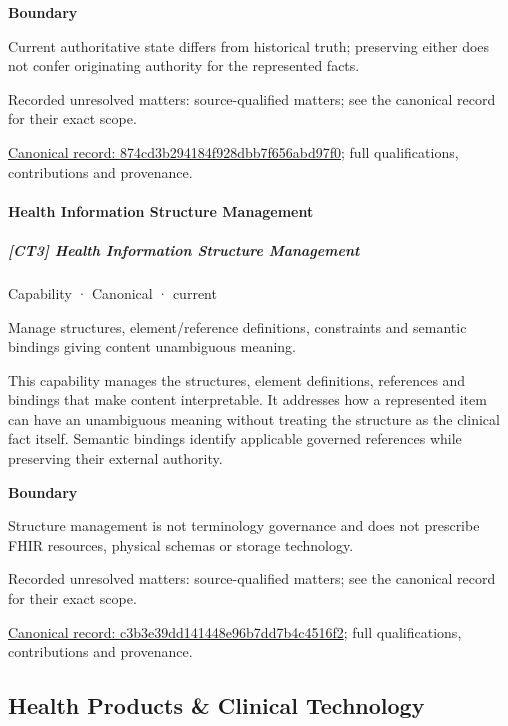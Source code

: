\textbf{Boundary}



Current authoritative state differs from historical truth; preserving either does not confer originating authority for the represented facts.


{\small Recorded unresolved matters: source-qualified matters; see the canonical record for their exact scope.}\par
{\footnotesize \href{../../../../continuum/strategy/capability/874cd3b294184f928dbb7f656abd97f0.md}{Canonical record: 874cd3b294184f928dbb7f656abd97f0}; full qualifications, contributions and provenance.}\par
\paragraph{Health Information Structure Management}

\subparagraph{[CT3] Health Information Structure Management}

\label{element:c3b3e39dd141448e96b7dd7b4c4516f2}
{\small Capability · Canonical · current}\par

Manage structures, element/reference definitions, constraints and semantic bindings giving content unambiguous meaning.



This capability manages the structures, element definitions, references and bindings that make content interpretable. It addresses how a represented item can have an unambiguous meaning without treating the structure as the clinical fact itself. Semantic bindings identify applicable governed references while preserving their external authority.



\textbf{Boundary}



Structure management is not terminology governance and does not prescribe FHIR resources, physical schemas or storage technology.


{\small Recorded unresolved matters: source-qualified matters; see the canonical record for their exact scope.}\par
{\footnotesize \href{../../../../continuum/strategy/capability/c3b3e39dd141448e96b7dd7b4c4516f2.md}{Canonical record: c3b3e39dd141448e96b7dd7b4c4516f2}; full qualifications, contributions and provenance.}\par
\subsection{Health Products \& Clinical Technology}

